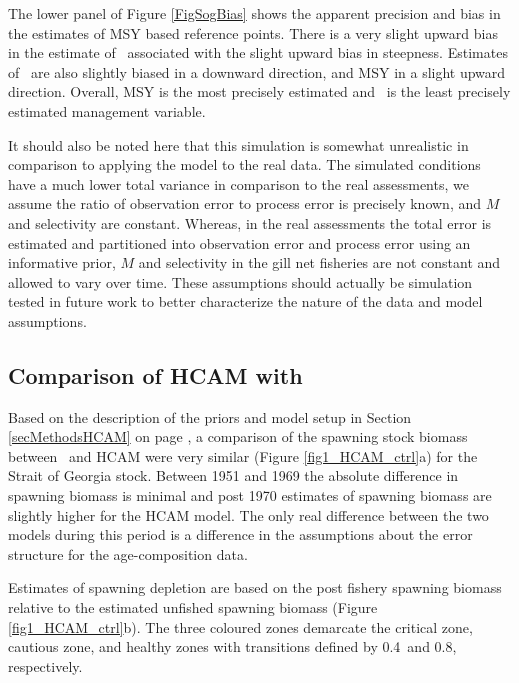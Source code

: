 The lower panel of Figure \ref{FigSogBias} shows the apparent precision and bias in the estimates of MSY based reference points.  There is a very slight upward bias in the estimate of \fmsy\ associated with the slight upward bias in steepness.  Estimates of \bmsy\ are also slightly biased in a downward direction, and MSY in a slight upward direction.  Overall, MSY is the most precisely estimated and \fmsy\ is the least precisely estimated management variable.

It should also be noted here that this simulation is somewhat unrealistic in comparison to applying the model to the real data.  The simulated conditions have a much lower total variance in comparison to the real assessments, we assume the ratio of observation error to process error is precisely known, and $M$ and selectivity are constant. Whereas, in the real assessments the total error is estimated and partitioned into observation error and process error using an informative prior, $M$ and selectivity in the gill net fisheries are not constant and allowed to vary over time.  These assumptions should actually be simulation tested in future work to better characterize the nature of the data and model assumptions.

	\subsection{Comparison of HCAM with \iscam}
	
	Based on the description of the priors and model setup in Section \ref{secMethodsHCAM} on page \pageref{secMethodsHCAM}, a comparison of the spawning stock biomass between \iscam\ and HCAM were very similar (Figure \ref{fig1_HCAM_ctrl}a) for the Strait of Georgia stock.  Between 1951 and 1969 the absolute difference in spawning biomass is minimal and post 1970 estimates of spawning biomass are slightly higher for the HCAM model. The only real difference between the two models during this period is a difference in the assumptions about the error structure for the age-composition data.
	
	Estimates of spawning depletion are based on the post fishery spawning biomass relative to the estimated unfished spawning biomass (Figure \ref{fig1_HCAM_ctrl}b).  The three coloured zones demarcate the critical zone, cautious zone, and healthy zones with transitions defined by 0.4\bmsy\ and 0.8\bmsy, respectively.
	
